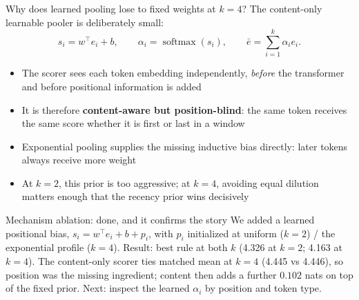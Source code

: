 \documentclass[10pt,aspectratio=169]{beamer}
\newcommand{\good}[1]{\textcolor{okgreen}{#1}}
\begin{document}
\begin{frame}{Why does learned pooling lose to fixed weights at $k{=}4$?}
  \footnotesize
  The content-only learnable pooler is deliberately small:
  \[
    s_i = w^\top e_i+b,\qquad
    \alpha_i=\operatorname{softmax}(s_i),\qquad
    \bar e=\sum_{i=1}^{k}\alpha_i e_i .
  \]

  \begin{itemize}
    \item The scorer sees each token embedding independently, \emph{before} the
          transformer and before positional information is added
    \item It is therefore \textbf{content-aware but position-blind}: the same
          token receives the same score whether it is first or last in a window
    \item Exponential pooling supplies the missing inductive bias directly:
          later tokens always receive more weight
    \item At $k{=}2$, this prior is too aggressive; at $k{=}4$, avoiding equal
          dilution matters enough that the recency prior wins decisively
  \end{itemize}

  \begin{block}{Mechanism ablation: done, and it confirms the story}
    We added a learned positional bias, $s_i=w^\top e_i+b+p_i$, with $p_i$
    initialized at uniform ($k{=}2$) / the exponential profile ($k{=}4$).
    Result: \good{best rule at both $k$} (4.326 at $k{=}2$; 4.163 at $k{=}4$).
    The content-only scorer ties matched mean at $k{=}4$ (4.445 vs 4.446), so
    position was the missing ingredient; content then adds a further
    $0.102$ nats on top of the fixed prior. Next: inspect the learned
    $\alpha_i$ by position and token type.
  \end{block}
\end{frame}
\end{document}
